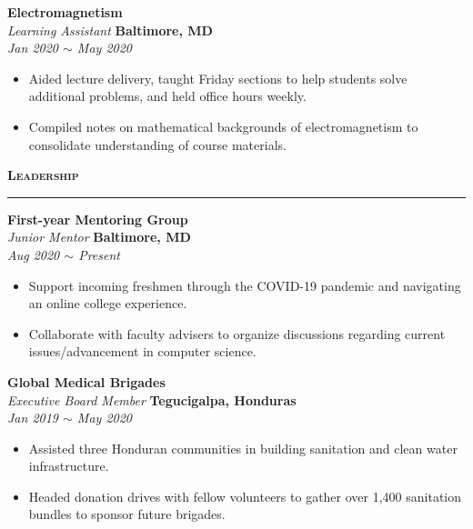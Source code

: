\documentclass[10pt, letterpaper]{article}
\begin{document}
\begin{paracol}{2}
	\textbf{Electromagnetism}\\
	\textit{Learning Assistant}
	\switchcolumn
	\raggedleft\textbf{Baltimore, MD}\\
	\raggedleft\textit{Jan 2020 $\sim$ May 2020}
\end{paracol}
\vspace{-5mm}
\begin{itemize}
	\item Aided lecture delivery, taught Friday sections to help students solve additional problems, and held office hours weekly.
	\vspace{-3mm}
	\item Compiled notes on mathematical backgrounds of electromagnetism to consolidate understanding of course materials.
\end{itemize}
\vspace{-3mm}

{\large \textbf{\textsc{Leadership}}}
\vspace{5pt}
\hrule

\begin{paracol}{2}
	\textbf{First-year Mentoring Group}\\
	\textit{Junior Mentor}
	\switchcolumn
	\raggedleft\textbf{Baltimore, MD}\\
	\raggedleft\textit{Aug 2020 $\sim$ Present}
\end{paracol}
\vspace{-5mm}
\begin{itemize}
	\item Support incoming freshmen through the COVID-19 pandemic and navigating an online college experience.
	\vspace{-3mm}
	\item Collaborate with faculty advisers to organize discussions regarding current issues/advancement in computer science.
\end{itemize}
\vspace{-3mm}

\begin{paracol}{2}
	\textbf{Global Medical Brigades}\\
	\textit{Executive Board Member}
	\switchcolumn
	\raggedleft\textbf{Tegucigalpa, Honduras}\\
	\raggedleft\textit{Jan 2019 $\sim$ May 2020}
\end{paracol}
\vspace{-5mm}
\begin{itemize}
	\item Assisted three Honduran communities in building sanitation and clean water infrastructure.\vspace{-3mm}
	\item Headed donation drives with fellow volunteers to gather over 1,400 sanitation bundles to sponsor future brigades.
\end{itemize}
\end{document}
